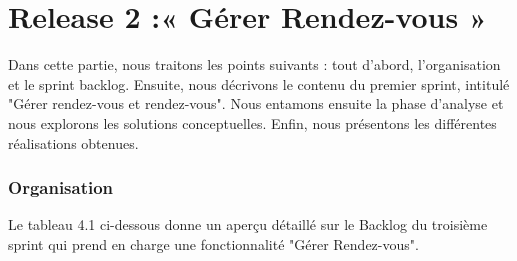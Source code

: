\chapter{Release 2 :« Gérer Rendez-vous » }
\label{chap_sprint3}
 Dans cette partie, nous traitons les points suivants : tout d'abord, l'organisation et le sprint backlog. Ensuite, nous décrivons le contenu du premier sprint, intitulé "Gérer rendez-vous et rendez-vous". Nous entamons ensuite la phase d'analyse et nous explorons les solutions conceptuelles. Enfin, nous présentons les différentes réalisations obtenues.
\subsection{Organisation}
Le tableau 4.1 ci-dessous donne un aperçu détaillé sur le Backlog du troisième sprint qui
prend en charge une fonctionnalité "Gérer Rendez-vous".
\\

